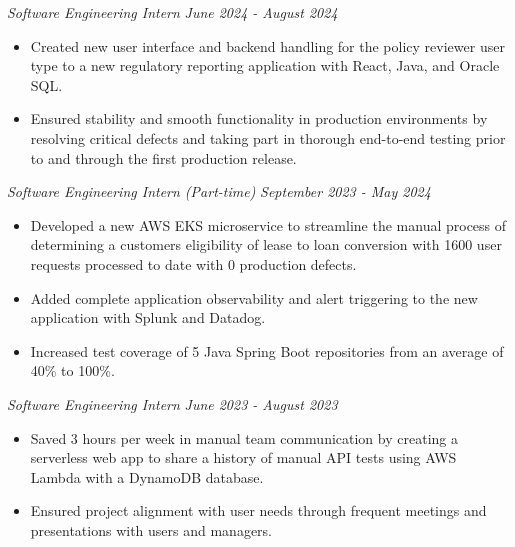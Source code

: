\documentclass[letterpaper]{article}
\begin{document}
    \textit{Software Engineering Intern} \hfill \textsl{June 2024 - August 2024}\\
    \vspace{-7pt}
    \begin{itemize} \itemsep -1mm

            \item Created new user interface and backend handling for the policy reviewer user type to a new regulatory reporting application with React, Java, and Oracle SQL.

            \item Ensured stability and smooth functionality in production environments by resolving critical defects and taking part in thorough end-to-end testing prior to and through the first production release.
        
    \end{itemize}
    \vspace{-2mm}

    \textit{Software Engineering Intern (Part-time)} \hfill \textsl{September 2023 - May 2024}\\
    \vspace{-7pt}
    \begin{itemize} \itemsep -1mm
    
            \item Developed a new AWS EKS microservice to streamline the manual process of determining a customers eligibility of lease to loan conversion with 1600 user requests processed to date with 0 production defects.

            \item Added complete application observability and alert triggering to the new application with Splunk and Datadog.

            \item Increased test coverage of 5 Java Spring Boot repositories from an average of 40\% to 100\%.
        
    \end{itemize}
    \vspace{-2mm}

    \textit{Software Engineering Intern} \hfill \textsl{June 2023 - August 2023}\\
    \vspace{-7pt}
    \begin{itemize} \itemsep -1mm
        
            \item Saved 3 hours per week in manual team communication by creating a serverless web app to share a history of manual API tests using AWS Lambda with a DynamoDB database.
        
            \item Ensured project alignment with user needs through frequent meetings and presentations with users and managers.
        
    \end{itemize}
    \vspace{-2mm}
\end{document}
